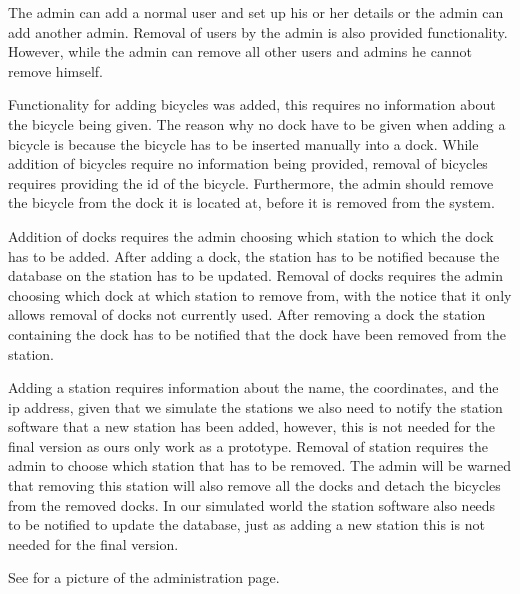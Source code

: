 \begin{description}[style=nextline]
\item[User] 
The admin can add a normal user and set up his or her details or the admin can add another admin.
Removal of users by the admin is also provided functionality.
However, while the admin can remove all other users and admins he cannot remove himself.
\item[Bicycle] 
Functionality for adding bicycles was added, this requires no information about the bicycle being given.
The reason why no dock have to be given when adding a bicycle is because the bicycle has to be inserted manually into a dock.
While addition of bicycles require no information being provided, removal of bicycles requires providing the id of the bicycle.
Furthermore, the admin should remove the bicycle from the dock it is located at, before it is removed from the system.
\item[Dock] 
Addition of docks requires the admin choosing which station to which the dock has to be added.
After adding a dock, the station has to be notified because the database on the station has to be updated.
Removal of docks requires the admin choosing which dock at which station to remove from, with the notice that it only allows removal of docks not currently used.
After removing a dock the station containing the dock has to be notified that the dock have been removed from the station.
\item[Station] 
Adding a station requires information about the name, the coordinates, and the ip address, given that we simulate the stations we also need to notify the station software that a new station has been added, however, this is not needed for the final version as ours only work as a prototype.
Removal of station requires the admin to choose which station that has to be removed.
The admin will be warned that removing this station will also remove all the docks and detach the bicycles from the removed docks.
In our simulated world the station software also needs to be notified to update the database, just as adding a new station this is not needed for the final version.
\end{description}
See  for a picture of the administration page.